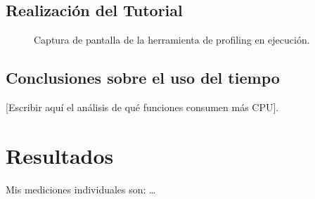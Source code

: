 \documentclass[12pt,a4paper]{article}
\begin{document}
	\subsection{Realización del Tutorial}
	\begin{figure}[H]
		\centering
		\caption{Captura de pantalla de la herramienta de profiling en ejecución.}
	\end{figure}
	
	\subsection{Conclusiones sobre el uso del tiempo}
	[Escribir aquí el análisis de qué funciones consumen más CPU].
	
	\section{Resultados}
	Mis mediciones individuales son: \dots
	
\end{document}
